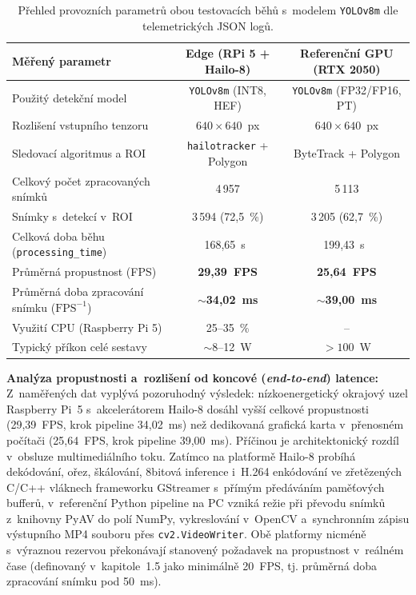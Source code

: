 \begin{table}[H]
    \centering
    \small\renewcommand{\arraystretch}{1.2}
    \setlength{\tabcolsep}{4pt}
    \begin{tabular}{|l|c|c|}
        \hline
        \textbf{Měřený parametr} & \textbf{Edge (RPi 5 + Hailo-8)} & \textbf{Referenční GPU (RTX 2050)} \\ \hline
        Použitý detekční model & \texttt{YOLOv8m} (INT8, HEF) & \texttt{YOLOv8m} (FP32/FP16, PT) \\ \hline
        Rozlišení vstupního tenzoru & $640 \times 640$~px & $640 \times 640$~px \\ \hline
        Sledovací algoritmus a ROI & \texttt{hailotracker} + Polygon & ByteTrack + Polygon \\ \hline
        Celkový počet zpracovaných snímků & 4\,957 & 5\,113 \\ \hline
        Snímky s~detekcí v~ROI & 3\,594 (72,5~\%) & 3\,205 (62,7~\%) \\ \hline
        Celková doba běhu (\texttt{processing\_time}) & 168,65~s~& 199,43~s~\\ \hline
        Průměrná propustnost (FPS) & \textbf{29,39~FPS} & \textbf{25,64~FPS} \\ \hline
        Průměrná doba zpracování snímku ($\text{FPS}^{-1}$) & \textbf{$\sim$34,02~ms} & \textbf{$\sim$39,00~ms} \\ \hline
        Využití \acs{CPU} (Raspberry Pi 5) & 25--35~\% & -- \\ \hline
        Typický příkon celé sestavy & $\sim$8--12~W & $> 100$~W \\ \hline
    \end{tabular}
    \caption{Přehled provozních parametrů obou testovacích běhů s~modelem \texttt{YOLOv8m} dle telemetrických JSON logů.}
    \label{tab:performance_eval}
\end{table}
\textbf{Analýza propustnosti a~rozlišení od koncové (\textit{end-to-end}) latence:} Z~naměřených dat vyplývá pozoruhodný výsledek: nízkoenergetický okrajový uzel Raspberry Pi~5 s~akcelerátorem Hailo-8 dosáhl vyšší celkové propustnosti (29,39~FPS, krok pipeline 34,02~ms) než dedikovaná grafická karta v~přenosném počítači (25,64~FPS, krok pipeline 39,00~ms). Příčinou je architektonický rozdíl v~obsluze multimediálního toku. Zatímco na platformě Hailo-8 probíhá dekódování, ořez, škálování, 8bitová inference i~H.264 enkódování ve zřetězených C/C++ vláknech frameworku GStreamer s~přímým předáváním paměťových bufferů, v~referenční Python pipeline na PC vzniká režie při převodu snímků z~knihovny PyAV do polí NumPy, vykreslování v~OpenCV a~synchronním zápisu výstupního MP4 souboru přes \texttt{cv2.VideoWriter}. Obě platformy nicméně s~výraznou rezervou překonávají stanovený požadavek na propustnost v~reálném čase (definovaný v~kapitole~1.5 jako minimálně 20~FPS, tj. průměrná doba zpracování snímku pod 50~ms).


